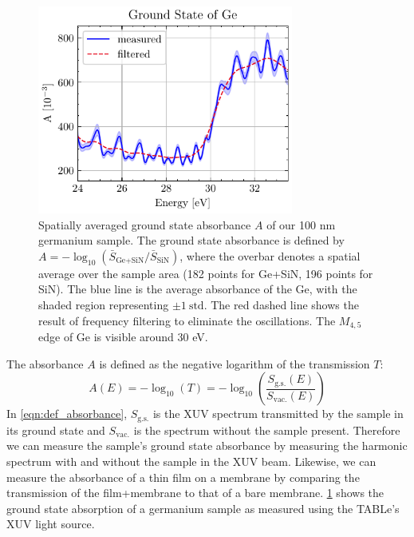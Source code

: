 \begin{figure}
	\centering
	\includegraphics[width=0.75\textwidth]{figures/chap4/Ge_ground_state.pdf}
	\caption{Spatially averaged ground state absorbance $A$ of our 100 nm germanium sample. The ground state absorbance is defined by $A=-\log_{10}(\bar{S}_{\textrm{Ge+SiN}} / \bar{S}_{\textrm{SiN}})$, where the overbar denotes a spatial average over the sample area (182 points for Ge+SiN, 196 points for SiN). The blue line is the average absorbance of the Ge, with the shaded region representing ${\pm 1 \ \textrm{std}}$. The red dashed line shows the result of frequency filtering to eliminate the oscillations. The $M_{4,5}$ edge of Ge is visible around 30 eV.}
	\label{fig:Ge_ground_state}
\end{figure}

The absorbance $A$ is defined as the negative logarithm of the transmission $T$:
\begin{equation}
A(E) = -\log_{10}(T) = - \log_{10} \left( \frac{S_{\textrm{g.s.}}(E)}{S_{\textrm{vac.}}(E)} \right)
\label{eqn:def_absorbance}
\end{equation}
In \cref{eqn:def_absorbance}, $S_{\textrm{g.s.}}$ is the XUV spectrum transmitted by the sample in its ground state and $S_{\textrm{vac.}}$ is the spectrum without the sample present. Therefore we can measure the sample's ground state absorbance by measuring the harmonic spectrum with and without the sample in the XUV beam. Likewise, we can measure the absorbance of a thin film on a membrane by comparing the transmission of the film+membrane to that of a bare membrane. \cref{fig:Ge_ground_state} shows the ground state absorption of a germanium sample as measured using the TABLe's XUV light source. 


